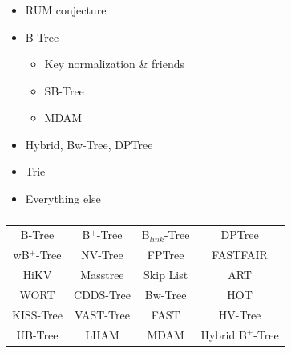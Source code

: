 \documentclass[usenames,dvipsnames, 18pt, compress, aspectratio=169]{beamer}
\begin{document}
\begin{frame}[fragile]{}
    \frametitle{}

    \begin{itemize}[label={\MVRightarrow}]
        \item RUM conjecture
        \item B-Tree
        \begin{itemize}[label={}]
            \item Key normalization \& friends
            \item SB-Tree
            \item MDAM
        \end{itemize}
        \item Hybrid, Bw-Tree, DPTree
        \item Trie
        \item Everything else
    \end{itemize}
\end{frame}

\begin{frame}[fragile]{}
    \frametitle{}

    \def\arraystretch{1.5}
    \begin{tabular}{cccc}
        B-Tree & B$^{+}$-Tree & B$_{link}$-Tree & DPTree \\
        wB$^{+}$-Tree & NV-Tree & FPTree & FASTFAIR \\
        HiKV & Masstree & Skip List & ART \\
        WORT & CDDS-Tree & Bw-Tree & HOT \\
        KISS-Tree & VAST-Tree & FAST & HV-Tree \\
        UB-Tree & LHAM & MDAM & Hybrid B$^{+}$-Tree
    \end{tabular}
\end{frame}
\end{document}
